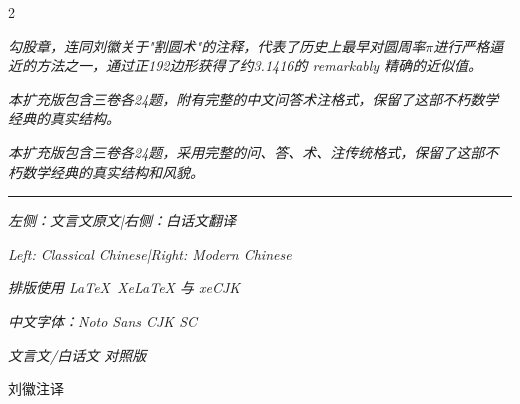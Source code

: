 \documentclass[10pt,a4paper]{article}
\begin{document}
\begin{paracol}{2}
\switchcolumn

\textit{勾股章，连同刘徽关于"割圆术"的注释，代表了历史上最早对圆周率$\pi$进行严格逼近的方法之一，通过正192边形获得了约3.1416的 remarkably 精确的近似值。}

\switchcolumn*

\textit{本扩充版包含三卷各24题，附有完整的中文问答术注格式，保留了这部不朽数学经典的真实结构。}

\switchcolumn

\textit{本扩充版包含三卷各24题，采用完整的问、答、术、注传统格式，保留了这部不朽数学经典的真实结构和风貌。}

\end{paracol}

\vspace{1cm}

\begin{center}
\rule{0.4\textwidth}{0.4pt}

\vspace{0.5cm}

{\small\textit{左侧：文言文原文\quad |\quad 右侧：白话文翻译}}

{\small\textit{Left: Classical Chinese\quad |\quad Right: Modern Chinese}}

{\small\textit{排版使用 \LaTeX\ XeLaTeX 与 xeCJK}}

{\small\textit{中文字体：Noto Sans CJK SC}}

{\small\textit{文言文/白话文 对照版}}

\vspace{0.5cm}

{\small 刘徽注译}
\end{center}
\end{document}
